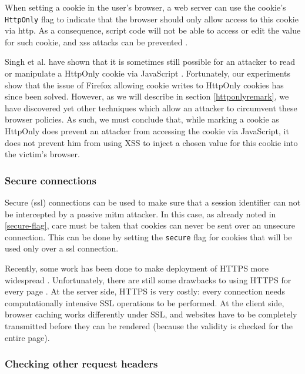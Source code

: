 When setting a cookie in the user's browser, a web server can use the cookie's \texttt{HttpOnly} flag to indicate that the browser should only allow access to this cookie via \gls{http}. As a consequence, script code will not be able to access or edit the value for such cookie, and \gls{xss} attacks can be prevented \cite{HttpOnly}.

Singh et al. have shown that it is sometimes still possible for an attacker to read or manipulate a HttpOnly cookie via JavaScript \cite{Singh2010}. Fortunately, our experiments show that the issue of Firefox allowing cookie writes to HttpOnly cookies has since been solved. However, as we will describe in section \ref{httponlyremark}, we have discovered yet other techniques which allow an attacker to circumvent these browser policies. As such, we must conclude that, while marking a cookie as HttpOnly does prevent an attacker from accessing the cookie via JavaScript, it does not prevent him from using XSS to inject a chosen value for this cookie into the victim's browser.

\subsubsection{Secure connections}\label{ssl}

Secure (\gls{ssl}) connections \cite{Stallings2011} can be used to make sure that a session identifier can not be intercepted by a passive \gls{mitm} attacker. In this case, as already noted in \ref{secure-flag}, care must be taken that cookies can never be sent over an unsecure connection. This can be done by setting the \texttt{secure} flag for cookies that will be used only over a \gls{ssl} connection.

Recently, some work has been done to make deployment of HTTPS more widespread \cite{Hodges2010,Jackson2008}. Unfortunately, there are still some drawbacks to using HTTPS for every page \cite{Adida2008}. At the server side, HTTPS is very costly: every connection needs computationally intensive SSL operations to be performed. At the client side, browser caching works differently under SSL, and websites have to be completely transmitted before they can be rendered (because the validity is checked for the entire page).

\subsubsection{Checking other request headers}

